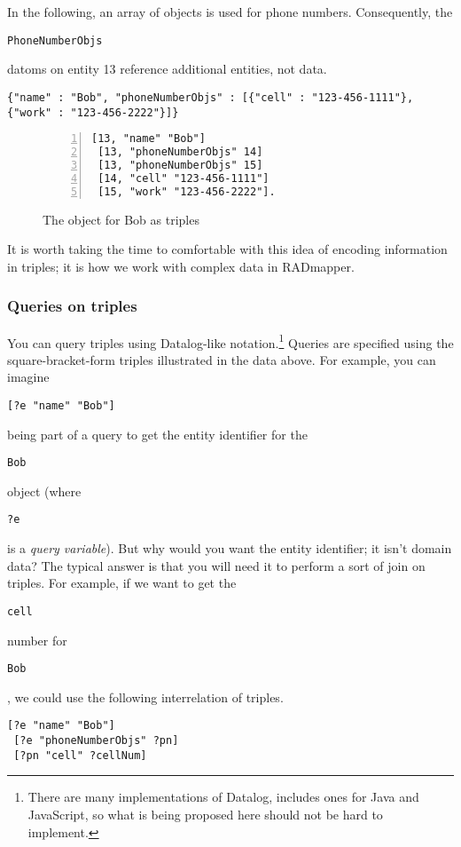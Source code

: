 \documentclass[9pt,letterpaper]{article}
\newcommand{\stt}[1]{\begin{footnotesize}\texttt{#1}\end{footnotesize}}
\begin{document}
In the following, an array of objects is used for phone numbers.
Consequently, the \stt{PhoneNumberObjs} datoms on entity 13 reference additional entities, not data.

\begin{lstlisting}[basicstyle=\ttfamily\scriptsize]
{"name" : "Bob", "phoneNumberObjs" : [{"cell" : "123-456-1111"}, {"work" : "123-456-2222"}]}
\end{lstlisting}

\begin{figure}[H]
  \caption{The object for Bob as triples}
  \label{code:bob-phone}
\begin{lstlisting}[numberstyle=\scriptsize,basicstyle=\ttfamily\scriptsize,numbers=left,stepnumber=1,breaklines=true]
 [13, "name" "Bob"]
 [13, "phoneNumberObjs" 14]
 [13, "phoneNumberObjs" 15]
 [14, "cell" "123-456-1111"]
 [15, "work" "123-456-2222"].
\end{lstlisting}
\end{figure}

It is worth taking the time to comfortable with this idea of encoding information in triples;
it is how we work with complex data in RADmapper.

\subsubsection{Queries on triples}

You can query triples using Datalog-like notation.\footnote{There are many implementations of Datalog, includes ones for Java and JavaScript, so what is being proposed here should not be hard to implement.}
Queries are specified using the square-bracket-form triples illustrated in the data above.
For example, you can imagine \stt{[?e "name" "Bob"]} being part of a query to get the entity identifier for the \stt{Bob} object (where \stt{?e} is a \textit{query variable}).
But why would you want the entity identifier; it isn't domain data?
The typical answer is that you will need it to perform a sort of join on triples.
For example, if we want to get the \stt{cell} number for \stt{Bob}, we could use the following interrelation of triples.

\begin{lstlisting}[basicstyle=\ttfamily\scriptsize]
 [?e "name" "Bob"]
 [?e "phoneNumberObjs" ?pn]
 [?pn "cell" ?cellNum]
\end{lstlisting}
\end{document}
